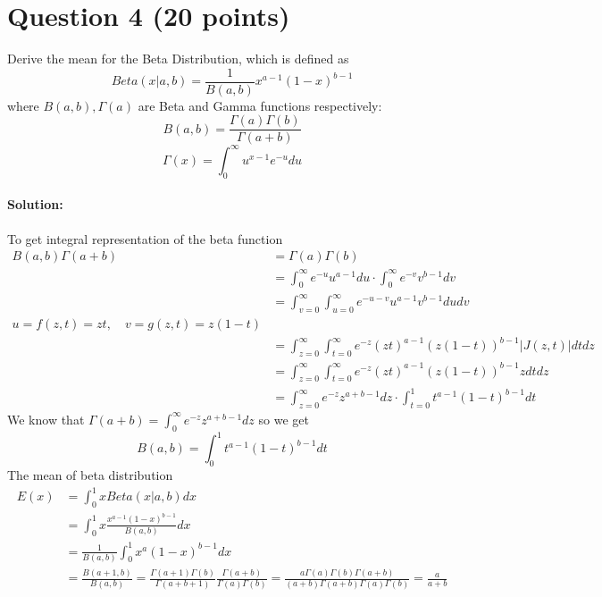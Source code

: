 \documentclass[
	10pt, %
]{../fphw}
\begin{document}
	\section*{Question 4 (20 points)}
	\begin{problem}
		Derive the mean for the Beta Distribution, which is defined as
		\begin{equation*}
			Beta(x|a,b)=\frac{1}{B(a,b)} x^{a-1}(1-x)^{b-1} 
		\end{equation*}
		where $B(a, b) , \Gamma(a)$ are Beta and Gamma functions respectively:
		\begin{equation*}
			B(a, b) = \frac{\Gamma (a)\Gamma (b)}{\Gamma (a+b)}
		\end{equation*}
		\begin{equation*}
			\Gamma(x) = \int_{0}^{\infty}u^{x-1}e^{-u}du
		\end{equation*}
	\end{problem}
	\paragraph{Solution:} To get integral representation of the beta function
	\begin{align*}
		B(a,b)\Gamma(a+b) &= \Gamma(a)\Gamma(b)\\
		&= \int_{0}^{\infty}e^{-u}u^{a-1}du \cdot \int_{0}^{\infty}e^{-v}v^{b-1}dv\\
		&= \int_{v=0}^{\infty}\int_{u=0}^{\infty}e^{-u-v}u^{a-1}v^{b-1}dudv\\
		u=f(z,t)=zt,\quad v=g(z,t)=z(1-t)\\
		&= \int_{z=0}^{\infty}\int_{t=0}^{\infty} e^{-z}(zt)^{a-1}(z(1-t))^{b-1}|J(z,t)|dtdz\\
		&= \int_{z=0}^{\infty}\int_{t=0}^{\infty} e^{-z}(zt)^{a-1}(z(1-t))^{b-1}zdtdz\\
		&= \int_{z=0}^{\infty}e^{-z}z^{a+b-1}dz \cdot \int_{t=0}^{1}t^{a-1}(1-t)^{b-1}dt
	\end{align*}
	We know that $\Gamma(a+b)=\int_{0}^{\infty}e^{-z}z^{a+b-1}dz$ so we get
	\begin{equation*}
		B(a,b) = \int_{0}^{1}t^{a-1}(1-t)^{b-1}dt
	\end{equation*}
	The mean of beta distribution
	\begin{align*}
		E(x) &= \int_{0}^{1}xBeta(x|a,b)dx\\
		&= \int_{0}^{1}x\frac{x^{a-1}(1-x)^{b-1}}{B(a,b)}dx\\
		&= \frac{1}{B(a,b)}\int_{0}^{1}x^a(1-x)^{b-1}dx\\
		&= \frac{B(a+1,b)}{B(a,b)} 
		= \frac{\Gamma(a+1)\Gamma(b)}{\Gamma(a+b+1)} \frac{\Gamma(a+b)}{\Gamma(a)\Gamma(b)} 
		= \frac{a\Gamma(a)\Gamma(b)\Gamma(a+b)} {(a+b)\Gamma(a+b)\Gamma(a)\Gamma(b)} 
		= \frac{a}{a+b}
	\end{align*}
	
\end{document}
